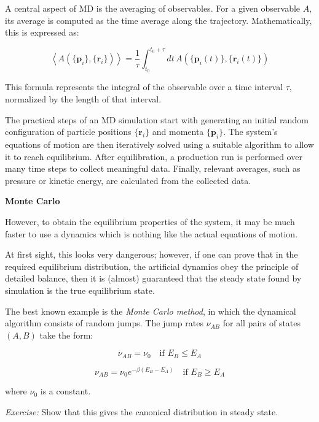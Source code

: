 \documentclass[
  letterpaper,
  enabledeprecatedfontcommands]{report}
\begin{document}
A central aspect of MD is the averaging of observables. For a given
observable \(A\), its average is computed as the time average along the
trajectory. Mathematically, this is expressed as:

\[
\left\langle A(\{ \mathbf{p}_i \}, \{ \mathbf{r}_i \}) \right\rangle = \frac{1}{\tau} \int_{t_0}^{t_0+\tau} dt\, A(\{ \mathbf{p}_i(t) \}, \{ \mathbf{r}_i(t) \})
\]

This formula represents the integral of the observable over a time
interval \(\tau\), normalized by the length of that interval.

The practical steps of an MD simulation start with generating an initial
random configuration of particle positions \(\{ \mathbf{r}_i \}\) and
momenta \(\{ \mathbf{p}_i \}\). The system's equations of motion are
then iteratively solved using a suitable algorithm to allow it to reach
equilibrium. After equilibration, a production run is performed over
many time steps to collect meaningful data. Finally, relevant averages,
such as pressure or kinetic energy, are calculated from the collected
data.

\textbf{Monte Carlo}

However, to obtain the equilibrium properties of the system, it may be
much faster to use a dynamics which is nothing like the actual equations
of motion.

At first sight, this looks very dangerous; however, if one can prove
that in the required equilibrium distribution, the artificial dynamics
obey the principle of detailed balance, then it is (almost) guaranteed
that the steady state found by simulation is the true equilibrium state.

The best known example is the \emph{Monte Carlo method}, in which the
dynamical algorithm consists of random jumps. The jump rates
\(\nu_{AB}\) for all pairs of states \((A, B)\) take the form:

\[
\nu_{AB} = \nu_0 \quad \text{if } E_B \le E_A
\]

\[
\nu_{AB} = \nu_0 e^{-\beta (E_B - E_A)} \quad \text{if } E_B \ge E_A
\]

where \(\nu_0\) is a constant.

\emph{Exercise:} Show that this gives the canonical distribution in
steady state.
\end{document}
